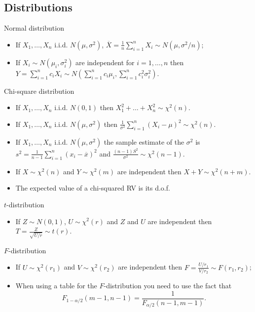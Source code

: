\documentclass[10pt, two column]{article}
\begin{document}
\subsection{Distributions}

Normal distribution
\begin{itemize}
\item If $X_{1}, \dots, X_{n}$ i.i.d. $N(\mu, \sigma^{2})$, $\overline{X} = \frac{1}{n} \sum_{i=1}^{n} X_{i} \sim N(\mu, \sigma^{2}/n)$;
\item If $X_{i} \sim N(\mu_{i}, \sigma_{i}^{2})$ are independent for $i = 1, \dots, n$ then $Y = \sum_{i=1}^{n} c_{i}X_{i} \sim N(\sum_{i=1}^{n} c_{i} \mu_{i}, \sum_{i=1}^{n} c_{i}^{2} \sigma_{i}^{2})$. \vspace{5pt}
\end{itemize}

Chi-square distribution
\begin{itemize}
\item If $X_{1}, \dots, X_{n}$ i.i.d. $N(0,1)$ then $X_{1}^{2} + \dots + X_{n}^{2} \sim \chi^{2}(n)$.
\item If $X_{1}, \dots, X_{n}$ i.i.d. $N(\mu,\sigma^{2})$ then $\frac{1}{\sigma^{2}} \sum_{i=1}^{n} (X_{i}-\mu)^{2} \sim \chi^{2}(n)$.
\item If $X_{1}, \dots, X_{n}$ i.i.d. $N(\mu,\sigma^{2})$ the sample estimate of the $\sigma^{2}$ is $s^{2} = \frac{1}{n-1} \sum_{i=1}^{n} (x_{i}-\overline{x})^{2}$ and $\frac{(n-1)S^{2}}{\sigma^{2}} \sim \chi^{2}(n-1)$. 
\item If $X \sim \chi^{2}(n)$ and $Y \sim \chi^{2}(m)$ are independent then $X + Y \sim \chi^{2}(n+m)$.
\item The expected value of a chi-squared RV is its d.o.f. \vspace{5pt}
\end{itemize}

$t$-distribution
\begin{itemize}
\item If $Z \sim N(0,1)$, $U \sim \chi^{2}(r)$ and $Z$ and $U$ are independent then $T = \frac{Z}{\sqrt{U/r}} \sim t(r)$. \vspace{5pt}
\end{itemize}

$F$-distribution
\begin{itemize}
\item If $U \sim \chi^{2}(r_{1})$ and $V \sim \chi^{2}(r_{2})$ are independent then $F = \frac{U/r_{1}}{V/r_{2}} \sim F(r_{1},r_{2})$;
\item When using a table for the $F$-distribution you need to use the fact that \vspace{-6pt} 
\[F_{1-\alpha/2}(m-1, n-1) = \frac{1}{F_{\alpha/2}(n-1, m-1)}.\] 
\end{itemize}
\end{document}
